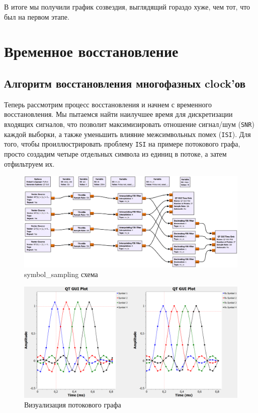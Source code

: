 \documentclass[a4paper,12pt]{report}
\begin{document}
В итоге мы получили график созвездия, выглядящий гораздо хуже, чем тот, что был на первом этапе.

\chapter{Временное восстановление}

\section{Алгоритм восстановления многофазных clock'ов}

Теперь рассмотрим процесс восстановления и начнем с временного восстановления. Мы пытаемся найти наилучшее время для дискретизации входящих сигналов, что позволит максимизировать отношение сигнал/шум (\texttt{SNR}) каждой выборки, а также уменьшить влияние межсимвольных помех (\texttt{ISI}). Для того, чтобы проиллюстрировать проблему \texttt{ISI} на примере потокового графа, просто создадим четыре отдельных символа из единиц в потоке, а затем отфильтруем их.

\begin{figure}[H]
        \centering
        \includegraphics[width=1.0\textwidth]{7.png}
        \caption{symbol\_sampling схема}
        \label{fig:lab12_fig3_1}
\end{figure}

\begin{figure}[H]
        \centering
        \includegraphics[width=1.0\textwidth]{8.png}
        \caption{Визуализация потокового графа}
        \label{fig:lab12_fig3_2}
\end{figure}
\end{document}
